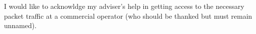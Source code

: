 I would like to acknowldge my adviser's help in getting access to the
necessary packet traffic at a commercial operator (who should be thanked but
must remain unnamed).